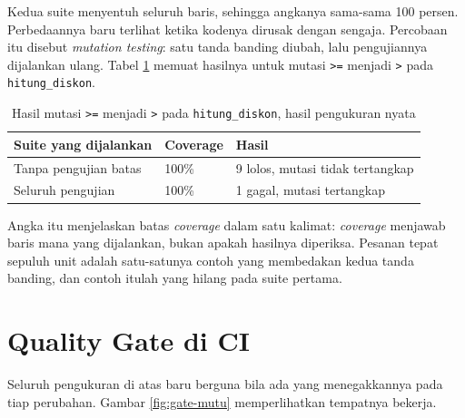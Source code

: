 Kedua suite menyentuh seluruh baris, sehingga angkanya sama-sama 100 persen.
Perbedaannya baru terlihat ketika kodenya dirusak dengan sengaja. Percobaan
itu disebut \textit{mutation testing}: satu tanda banding diubah, lalu
pengujiannya dijalankan ulang. Tabel \ref{tab:mutasi} memuat hasilnya untuk
mutasi \texttt{>=} menjadi \texttt{>} pada \texttt{hitung\_diskon}.

\begin{table}[!htb]
  \centering
  \caption{Hasil mutasi \texttt{>=} menjadi \texttt{>} pada
           \texttt{hitung\_diskon}, hasil pengukuran nyata}
  \label{tab:mutasi}
  \begin{tabularx}{\textwidth}{Xll}
    \hline
    \textbf{Suite yang dijalankan} & \textbf{Coverage} & \textbf{Hasil} \\
    \hline
    Tanpa pengujian batas & 100\% & 9 lolos, mutasi tidak tertangkap \\
    \hline
    Seluruh pengujian & 100\% & 1 gagal, mutasi tertangkap \\
    \hline
  \end{tabularx}
\end{table}

Angka itu menjelaskan batas \textit{coverage} dalam satu kalimat:
\textit{coverage} menjawab baris mana yang dijalankan, bukan apakah hasilnya
diperiksa. Pesanan tepat sepuluh unit adalah satu-satunya contoh yang
membedakan kedua tanda banding, dan contoh itulah yang hilang pada suite
pertama.

\section{Quality Gate di CI}

Seluruh pengukuran di atas baru berguna bila ada yang menegakkannya pada tiap
perubahan. Gambar \ref{fig:gate-mutu} memperlihatkan tempatnya bekerja.

